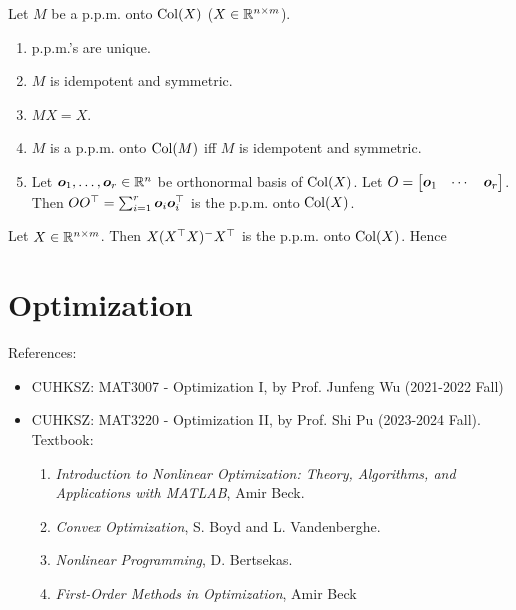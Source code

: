 \documentclass[10pt,a4paper]{book}
\begin{document}
\begin{thmbox}
	\begin{theorem}[Properties of p.p.m.]\label{thm:prop_ppm}
		Let $M$ be a p.p.m. onto $\mathrm{Col}(X)$ ($X\in\mathbb R^{n\times m}$). 
		\begin{enumerate}
			\item p.p.m.'s are unique.
			\item $M$ is idempotent and symmetric.
			\item $MX=X$. 
			\item $M$ is a p.p.m. onto $\mathrm{Col}(M)$ iff $M$ is idempotent and symmetric.
			\item Let ${\boldsymbol o}_1,\ldots,{\boldsymbol o}_r\in\mathbb R^{n}$ be orthonormal basis of $\mathrm{Col}(X)$. Let $O=\begin{bmatrix}
				{\boldsymbol o}_1 & \cdots & {\boldsymbol o}_r
			\end{bmatrix}$. Then $O O^\top=\sum_{i=1}^{r}{\boldsymbol o}_i{\boldsymbol o}_i^\top$ is the p.p.m. onto $\mathrm{Col}(X)$.        
		\end{enumerate}
	\end{theorem}
\end{thmbox}

\begin{exbox}
	\begin{example}[Regression]\label{ex:ppm_reg}
		Let $X\in\mathbb R^{n\times m}$. Then $X(X^\top X)^{-}X^\top$ is the p.p.m. onto $\mathrm{Col}(X)$. 
		Hence
	\end{example}
\end{exbox}


\chapter{Optimization}\label{chap:opt}

References: 
\begin{itemize}
	\item CUHKSZ: MAT3007 - Optimization I, by Prof. Junfeng Wu (2021-2022 Fall)
	\item CUHKSZ: MAT3220 - Optimization II, by Prof. Shi Pu (2023-2024 Fall). Textbook: 
	\begin{enumerate}
		\item \textit{Introduction to Nonlinear Optimization: Theory, Algorithms, and
		Applications with MATLAB}, Amir Beck.
		\item \textit{Convex Optimization}, S. Boyd and L. Vandenberghe.
		\item \textit{Nonlinear Programming}, D. Bertsekas.
		\item \textit{First-Order Methods in Optimization}, Amir Beck
	\end{enumerate}
\end{itemize}
\end{document}
